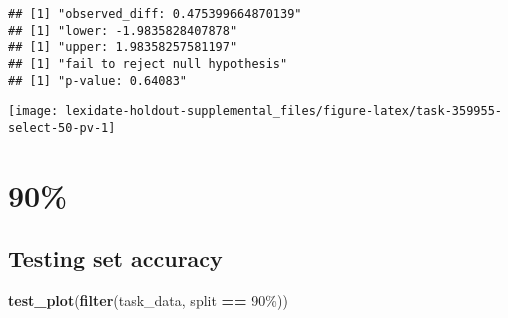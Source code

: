 \documentclass[
]{book}
\newenvironment{Shaded}{\begin{snugshade}}{\end{snugshade}}
\newcommand{\AttributeTok}[1]{\textcolor[rgb]{0.13,0.29,0.53}{#1}}
\newcommand{\DecValTok}[1]{\textcolor[rgb]{0.00,0.00,0.81}{#1}}
\newcommand{\FunctionTok}[1]{\textcolor[rgb]{0.13,0.29,0.53}{\textbf{#1}}}
\newcommand{\NormalTok}[1]{#1}
\newcommand{\OtherTok}[1]{\textcolor[rgb]{0.56,0.35,0.01}{#1}}
\newcommand{\SpecialCharTok}[1]{\textcolor[rgb]{0.81,0.36,0.00}{\textbf{#1}}}
\newcommand{\StringTok}[1]{\textcolor[rgb]{0.31,0.60,0.02}{#1}}
\begin{document}
\begin{Shaded}
\end{Shaded}

\begin{verbatim}
## [1] "observed_diff: 0.475399664870139"
## [1] "lower: -1.9835828407878"
## [1] "upper: 1.98358257581197"
## [1] "fail to reject null hypothesis"
## [1] "p-value: 0.64083"
\end{verbatim}

\texttt{[image: lexidate-holdout-supplemental\_files/figure-latex/task-359955-select-50-pv-1]}

\hypertarget{section-13}{%
\section{90\%}\label{section-13}}

\hypertarget{testing-set-accuracy-13}{%
\subsection{Testing set accuracy}\label{testing-set-accuracy-13}}

\begin{Shaded}
\begin{Highlighting}[]
\FunctionTok{test\_plot}\NormalTok{(}\FunctionTok{filter}\NormalTok{(task\_data, split }\SpecialCharTok{==} \StringTok{\textquotesingle{}90\%\textquotesingle{}}\NormalTok{))}
\end{Highlighting}
\end{Shaded}
\end{document}
